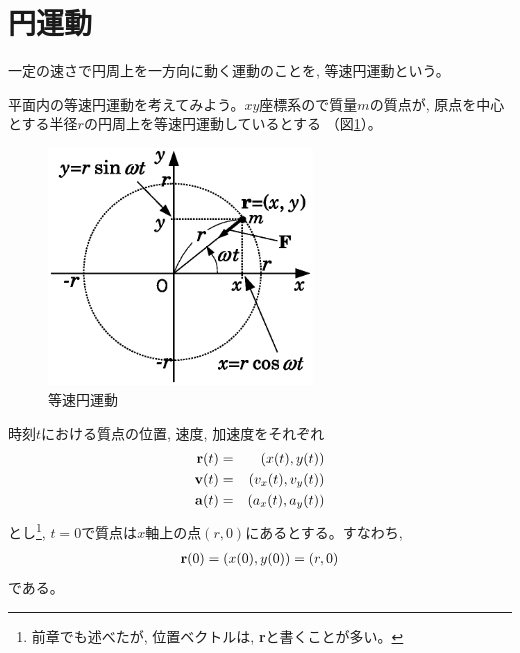 \section{円運動}

一定の速さで円周上を一方向に動く運動のことを, 等速円運動という。

平面内の等速円運動を考えてみよう。$xy$座標系ので質量$m$の質点が, 
原点を中心とする半径$r$の円周上を等速円運動しているとする
（図\ref{fig:circular_motion}）。
\begin{figure}[h]
    \centering
    \includegraphics[width=7.0cm]{circular_motion.eps}
    \caption{等速円運動}\label{fig:circular_motion}
\end{figure}

時刻$t$における質点の位置, 速度, 加速度をそれぞれ
\begin{eqnarray}
{\bf r}(t)&=&(x(t), y(t))\\
{\bf v}(t)&=&(v_x(t), v_y(t))\\
{\bf a}(t)&=&(a_x(t), a_y(t))
\end{eqnarray}
とし\footnote{前章でも述べたが, 位置ベクトルは, {\bf r}と書くことが多い。}, 
$t=0$で質点は$x$軸上の点$(r, 0)$にあるとする。すなわち, 
\begin{eqnarray}
{\bf r}(0)=(x(0), y(0))=(r, 0)
\end{eqnarray}
である。

